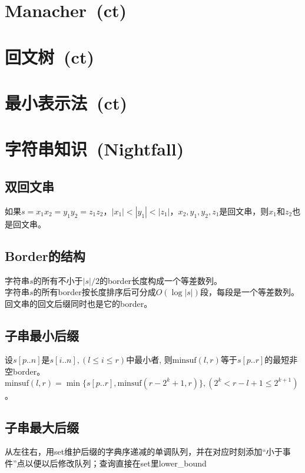 \section{Manacher~\small(ct)}

\section{回文树~\small(ct)}

\section{最小表示法~\small(ct)}

\section{字符串知识~\small(Nightfall)}
    \subsection*{双回文串}
        如果$ s = x_1 x_2 = y_1 y_2 = z_1 z_2 $，$ \left|x_1\right| < \left|y_1\right| < \left|z_1\right| $，$ x_2, y_1, y_2, z_1 $是回文串，则$ x_1 $和$ z_2 $也是回文串。
    \subsection*{Border的结构}
        字符串$ s $的所有不小于$ \left|s\right| / 2 $的border长度构成一个等差数列。
        \\字符串$ s $的所有border按长度排序后可分成$ O(\log \left| s \right|) $段，每段是一个等差数列。
        \\回文串的回文后缀同时也是它的border。
    \subsection*{子串最小后缀}
        设$ s[p..n] $是$ s[i..n], (l \leq i \leq r) $中最小者, 则$ \text{minsuf}(l, r) $等于$ s[p..r] $的最短非空border。$ \text{minsuf}(l, r) = \min \lbrace s[p..r], \text{minsuf}(r - 2^k + 1, r) \rbrace, (2^k < r - l + 1 \leq 2^{k + 1} ) $。
    \subsection*{子串最大后缀}
        从左往右，用set维护后缀的字典序递减的单调队列，并在对应时刻添加“小于事件”点以便以后修改队列；查询直接在set里lower\_bound

